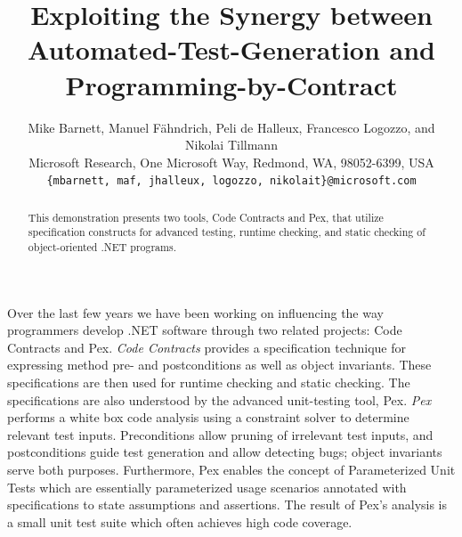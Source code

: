 \documentclass[10pt,twocolumn]{article}
\begin{document}
\title{Exploiting the Synergy between Automated-Test-Generation and Programming-by-Contract} 

\author{Mike Barnett, Manuel F\"ahndrich, Peli de Halleux, Francesco Logozzo, and Nikolai Tillmann\\
Microsoft Research, One Microsoft Way, Redmond, WA, 98052-6399, USA\\
{\tt \{mbarnett, maf, jhalleux, logozzo, nikolait\}@microsoft.com}\\
}

\maketitle
\thispagestyle{empty}

\begin{abstract}
This demonstration presents two tools, Code Contracts and Pex, that utilize specification
constructs for advanced testing, runtime checking, and static checking
of object-oriented .NET programs. 
\end{abstract}
\vspace*{-5mm}

Over the last few years we have been working on influencing the way programmers
develop .NET software through two related projects: Code Contracts and Pex.
{\em Code Contracts} provides a specification technique for expressing
method pre- and postconditions as well as object invariants.
These specifications are then used for runtime checking and static
checking.
The specifications are also understood by the advanced unit-testing
tool, Pex.
{\em Pex} 
performs a white box code analysis using a constraint solver to determine relevant test inputs.
Preconditions allow pruning of irrelevant test inputs, and
postconditions guide test generation and allow detecting bugs;
object invariants serve both purposes.
Furthermore, Pex enables the concept of Parameterized Unit Tests
which are essentially parameterized usage scenarios 
annotated with specifications to state assumptions and assertions.
The result of Pex's analysis is a small unit test suite which often achieves high code coverage.
\end{document}
